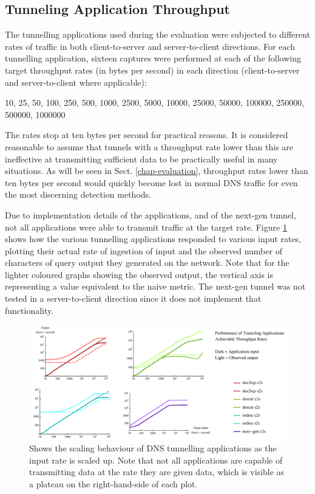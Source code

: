 \documentclass{llncs}
\begin{document}
\subsection{Tunneling Application Throughput}
\label{tunapptp}
The tunnelling applications used during the evaluation were subjected to
different rates of traffic in both client-to-server and server-to-client
directions. For each tunnelling application, sixteen captures were performed at
each of the following target throughput rates (in bytes per second) in each
direction (client-to-server and server-to-client where applicable):

10, 25, 50, 100, 250, 500, 1000, 2500, 5000, 10000, 25000, 50000, 100000,
250000, 500000, 1000000

The rates stop at ten bytes per second for practical reasons. It is considered
reasonable to assume that tunnels with a throughput rate lower than this are
ineffective at transmitting sufficient data to be practically useful in many
situations. As will be seen in Sect. \ref{chap-evaluation}, throughput rates
lower than ten bytes per second would quickly become lost in normal DNS
traffic for even the most discerning detection methods.

Due to implementation details of the applications, and of the next-gen tunnel,
not all applications were able to transmit traffic at the target rate. Figure
\ref{tunrates} shows how the various tunnelling applications responded to
various input rates, plotting their actual rate of ingestion of input and the
observed number of characters of query output they generated on the network.
Note that for the lighter coloured graphs showing the observed output, the
vertical axis is representing a value equivalent to the naive metric. The
next-gen tunnel was not tested in a server-to-client direction since it does not
implement that functionality.

\begin{figure}
\centering
\includegraphics[width=\textwidth]{../figures/tunrates.pdf}
\caption[DNS Tunneling Application Throughput Scaling]{Shows the scaling
behaviour of DNS tunnelling applications as the input rate is scaled up. Note
that not all applications are capable of transmitting data at the rate they are
given data, which is visible as a plateau on the right-hand-side of each plot.}
\label{tunrates}
\end{figure}
\end{document}
